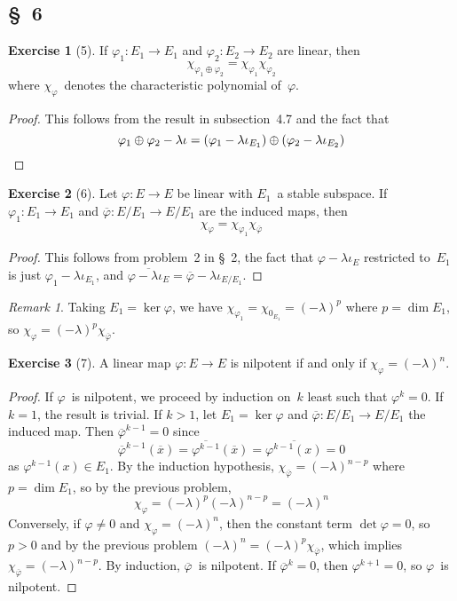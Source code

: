 \documentclass[letterpaper,12pt]{article}
\newcommand{\dsum}{\oplus}
\newcommand{\proj}[1]{\overline{#1}}
\theoremstyle{definition}
\newtheorem*{exer}{Exercise}
\theoremstyle{remark}
\newtheorem*{rmk}{Remark}
\begin{document}
\subsection*{\S~6}
\begin{exer}[5]
If \(\varphi_1:E_1\to E_1\) and \(\varphi_2:E_2\to E_2\) are linear, then
\[\chi_{\varphi_1\dsum\varphi_2}=\chi_{\varphi_1}\chi_{\varphi_2}\]
where \(\chi_{\varphi}\)~denotes the characteristic polynomial of~\(\varphi\).
\end{exer}
\begin{proof}
This follows from the result in subsection~4.7 and the fact that
\[\varphi_1\dsum\varphi_2-\lambda\iota=(\varphi_1-\lambda\iota_{E_1})\dsum(\varphi_2-\lambda\iota_{E_2})\qedhere\]
\end{proof}

\begin{exer}[6]
Let \(\varphi:E\to E\) be linear with \(E_1\)~a stable subspace. If \(\varphi_1:E_1\to E_1\) and \(\proj{\varphi}:E/E_1\to E/E_1\) are the induced maps, then
\[\chi_{\varphi}=\chi_{\varphi_1}\chi_{\proj{\varphi}}\]
\end{exer}
\begin{proof}
This follows from problem~2 in \S~2, the fact that \(\varphi-\lambda\iota_E\) restricted to~\(E_1\) is just \(\varphi_1-\lambda\iota_{E_1}\), and \(\proj{\varphi-\lambda\iota_E}=\proj{\varphi}-\lambda\iota_{E/E_1}\).
\end{proof}
\begin{rmk}
Taking \(E_1=\ker\varphi\), we have \(\chi_{\varphi_1}=\chi_{0_{E_1}}=(-\lambda)^p\) where \(p=\dim E_1\), so \(\chi_{\varphi}=(-\lambda)^p\chi_{\proj{\varphi}}\).
\end{rmk}

\begin{exer}[7]
A linear map \(\varphi:E\to E\) is nilpotent if and only if \(\chi_{\varphi}=(-\lambda)^n\).
\end{exer}
\begin{proof}
If \(\varphi\)~is nilpotent, we proceed by induction on~\(k\) least such that \(\varphi^k=0\). If \(k=1\), the result is trivial. If \(k>1\), let \(E_1=\ker\varphi\) and \(\proj{\varphi}:E/E_1\to E/E_1\) the induced map. Then \(\proj{\varphi}^{k-1}=0\) since
\[\proj{\varphi}^{k-1}(\proj{x})=\proj{\varphi^{k-1}}(\proj{x})=\proj{\varphi^{k-1}(x)}=0\]
as \(\varphi^{k-1}(x)\in E_1\). By the induction hypothesis, \(\chi_{\proj{\varphi}}=(-\lambda)^{n-p}\) where \(p=\dim E_1\), so by the previous problem,
\[\chi_{\varphi}=(-\lambda)^p(-\lambda)^{n-p}=(-\lambda)^n\]
Conversely, if \(\varphi\ne0\) and \(\chi_{\varphi}=(-\lambda)^n\), then the constant term \(\det\varphi=0\), so \(p>0\) and by the previous problem \((-\lambda)^n=(-\lambda)^p\chi_{\proj{\varphi}}\), which implies \(\chi_{\proj{\varphi}}=(-\lambda)^{n-p}\). By induction, \(\proj{\varphi}\)~is nilpotent. If \(\proj{\varphi}^k=0\), then \(\varphi^{k+1}=0\), so \(\varphi\)~is nilpotent.
\end{proof}
\end{document}
